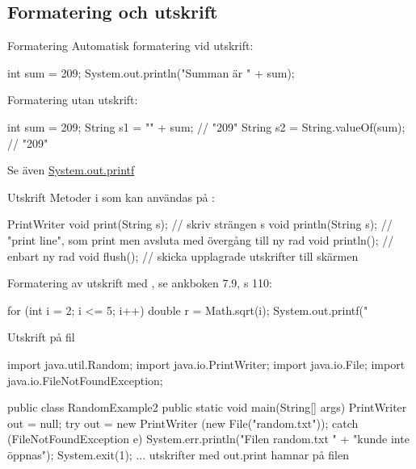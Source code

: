 \documentclass{lecturenotes}
\begin{document}
\subsection{Formatering och utskrift}
\begin{Slide}{Formatering}
Automatisk formatering vid utskrift:
\begin{Code}
int sum = 209;
System.out.println("Summan är " + sum);
\end{Code}
Formatering utan utskrift:
\begin{Code}
int sum = 209;
String s1 = "" + sum;            // "209"
String s2 = String.valueOf(sum); // "209"
\end{Code}
Se även \href{http://stackoverflow.com/questions/18730978/how-do-i-use-system-out-printf}{System.out.printf}
\end{Slide} 

\begin{Slide}{Utskrift}
Metoder i \href{http://docs.oracle.com/javase/8/docs/api/java/io/PrintWriter.html}{} som kan användas på :
\begin{ClassSpec}{PrintWriter}
void print(String s);   // skriv strängen s
void println(String s); // "print line", som print men avsluta med övergång till ny rad
void println();         // enbart ny rad
void flush();           // skicka upplagrade utskrifter till skärmen
\end{ClassSpec}

Formatering av utskrift med , se ankboken 7.9, s 110:
\begin{Code}
for (int i = 2; i <= 5; i++) {
    double r = Math.sqrt(i);
    System.out.printf("%
}
\end{Code}
\end{Slide} 

\begin{Slide}{Utskrift på fil}

\begin{Code}
import java.util.Random;
import java.io.PrintWriter;
import java.io.File;
import java.io.FileNotFoundException;

public class RandomExample2 {
    public static void main(String[] args) {
        PrintWriter out = null;
        try {
            out = new PrintWriter
                      (new File("random.txt"));
        } catch (FileNotFoundException e) {
            System.err.println("Filen random.txt " + 
                               "kunde inte öppnas");
            System.exit(1);
        }
        ... utskrifter med out.print hamnar på filen
    }
}
\end{Code}
\end{Slide} 
\end{document}

